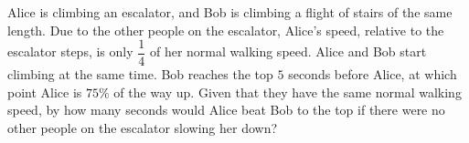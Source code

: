 Alice is climbing an escalator, and Bob is climbing a flight of stairs of the same length. Due to the other people on the escalator, Alice's speed, relative to the escalator steps, is only $\dfrac{1}{4}$ of her normal walking speed. Alice and Bob start climbing at the same time. Bob reaches the top $5$ seconds before Alice, at which point Alice is $75\%$ of the way up. Given that they have the same normal walking speed, by how many seconds would Alice beat Bob to the top if there were no other people on the escalator slowing her down?
